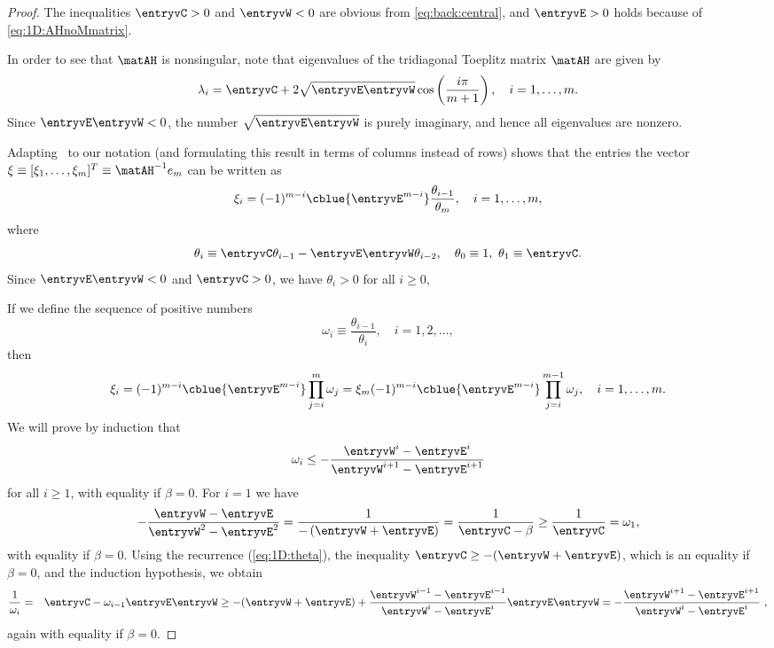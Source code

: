 \begin{proof}
The inequalities $\entryvC>0$ and $\entryvW<0$ are obvious from
\eqref{eq:back:central}, and $\entryvE>0$ holds because of \eqref{eq:1D:AHnoMmatrix}.

In order to see that $\matAH$ is nonsingular, note that eigenvalues of the
tridiagonal Toeplitz matrix $\matAH$ are given by
%
$$\lambda_{i}=\entryvC+2\sqrt{\entryvE\entryvW}\cos\left(\frac{i\pi}{m+1}\right),\quad i=1,\dots,m.$$
%
Since $\entryvE\entryvW<0$, the number $\sqrt{\entryvE\entryvW}$ is purely
imaginary, and hence all eigenvalues are nonzero.

Adapting~\cite[Theorem~2]{Usm94} to our notation (and formulating this result
in terms of columns instead of rows) shows that the entries the vector
$\xi \equiv [\xi_1,\dots,\xi_m]^T\equiv \matAH^{-1}e_m$ can be written as
%
$$\xi_{i}=(-1)^{m-i}\cblue{\entryvE^{m-i}}\frac{\theta_{i-1}}{\theta_{m}}, \quad i=1,\dots,m,$$
%
where
%
\begin{equation}\label{eq:1D:theta}
\theta_{i} \equiv \entryvC\theta_{i-1}-\entryvE\entryvW\theta_{i-2},
\quad\theta_{0}\equiv 1,\ \theta_{1}\equiv \entryvC.
\end{equation}
%
Since $\entryvE\entryvW<0$ and $\entryvC>0$, we have $\theta_{i}>0$ for all
$i\geq 0$, 

If we define the sequence of positive numbers
%
$$\omega_{i}\equiv\frac{\theta_{i-1}}{\theta_{i}},\quad i=1,2,\dots,$$
%
then
%
\begin{equation}\label{eq:1D:eqxi}
\xi_{i}  =  (-1)^{m-i}\cblue{\entryvE^{m-i}}\prod_{j=i}^{m}\omega_{j}=
\xi_m (-1)^{m-i}\cblue{\entryvE^{m-i}}\prod_{j=i}^{m-1}\omega_{j},\quad i=1,\dots,m.
\end{equation}
%
We will prove by induction that
%
\begin{equation}
\omega_{i}\leq-\frac{\entryvW^{i}-\entryvE^{i}}{\entryvW^{i+1}-\entryvE^{i+1}}\label{eq:1D:omega}
\end{equation}
%
for all $i\geq 1$, with equality if $\beta =0$. For $i=1$ we have
%
$$-\frac{\entryvW-\entryvE}{\entryvW^{2}-\entryvE^{2}}=
\frac{1}{-\left(\entryvW+\entryvE\right)}=\frac{1}{\entryvC-\beta}\geq\frac{1}{\entryvC}
=\omega_{1},$$
%
with equality if $\beta=0$. Using the recurrence (\ref{eq:1D:theta}), the
inequality $\entryvC\geq-(\entryvW+\entryvE)$, which is an equality if
$\beta=0$, and the induction hypothesis, we obtain
%
\begin{eqnarray*}
\frac{1}{\omega_{i}} & = & \entryvC-\omega_{i-1}\entryvE\entryvW
 \geq  -(\entryvW+\entryvE)+\frac{\entryvW^{i-1}-\entryvE^{i-1}}{\entryvW^{i}-\entryvE^{i}}\entryvE\entryvW
  =  -\frac{\entryvW^{i+1}-\entryvE^{i+1}}{\entryvW^{i}-\entryvE^{i}} ~,
\end{eqnarray*}
%
again with equality if $\beta=0$.


\end{proof}
